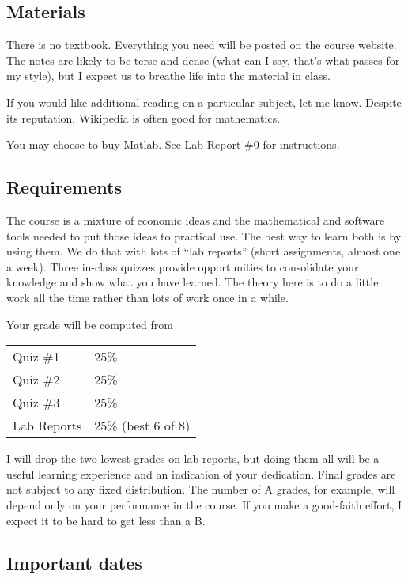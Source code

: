 \documentclass[11pt]{article}
\begin{document}
\subsection*{Materials}

There is no textbook.  Everything you need will be
posted on the course website.
The notes are likely to be terse and dense
(what can I say, that's what passes for my style),
but I expect us to breathe life into the material in class.

If you would like additional reading on a particular subject,
let me know.
Despite its reputation,
Wikipedia is often good for mathematics.

You may choose to buy Matlab.  See Lab Report \#0 for instructions.


\subsection*{Requirements}

The course is a mixture of economic ideas and
the mathematical and software tools needed to put those ideas to practical use.
The best way to learn both is by using them.
We do that with lots of ``lab reports'' (short assignments, almost one a week).
Three in-class quizzes provide opportunities to consolidate your knowledge
and show what you have learned.
The theory here is to do a little work all the time rather than lots of
work once in a while.

Your grade will be computed from
\begin{center}
\begin{tabular}{ll}
Quiz \#1    &   25\% \\
Quiz \#2    &   25\% \\
Quiz \#3    &   25\% \\
Lab Reports  \hspace*{0.25in}    &   25\%  (best 6 of 8)
\end{tabular}
\end{center}
I will drop the two lowest grades on lab reports,
but doing them all will be a useful learning experience
and an indication of your dedication.
Final grades are not subject to any fixed distribution.
The number of A grades, for example,
will depend only on your performance in the course.
If you make a good-faith effort,
I expect it to be hard to get less than a B.


\subsection*{Important dates}
\end{document}
